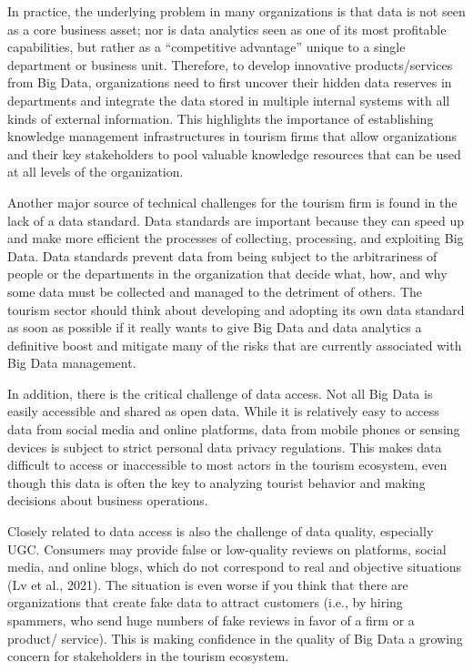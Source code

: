 \documentclass[
  letterpaper,
  DIV=11,
  numbers=noendperiod]{scrreprt}
\begin{document}
In practice, the underlying problem in many organizations is that data
is not seen as a core business asset; nor is data analytics seen as one
of its most profitable capabilities, but rather as a ``competitive
advantage'' unique to a single department or business unit. Therefore,
to develop innovative products/services from Big Data, organizations
need to first uncover their hidden data reserves in departments and
integrate the data stored in multiple internal systems with all kinds of
external information. This highlights the importance of establishing
knowledge management infrastructures in tourism firms that allow
organizations and their key stakeholders to pool valuable knowledge
resources that can be used at all levels of the organization.

Another major source of technical challenges for the tourism firm is
found in the lack of a data standard. Data standards are important
because they can speed up and make more efficient the processes of
collecting, processing, and exploiting Big Data. Data standards prevent
data from being subject to the arbitrariness of people or the
departments in the organization that decide what, how, and why some data
must be collected and managed to the detriment of others. The tourism
sector should think about developing and adopting its own data standard
as soon as possible if it really wants to give Big Data and data
analytics a definitive boost and mitigate many of the risks that are
currently associated with Big Data management.

In addition, there is the critical challenge of data access. Not all Big
Data is easily accessible and shared as open data. While it is
relatively easy to access data from social media and online platforms,
data from mobile phones or sensing devices is subject to strict personal
data privacy regulations. This makes data difficult to access or
inaccessible to most actors in the tourism ecosystem, even though this
data is often the key to analyzing tourist behavior and making decisions
about business operations.

Closely related to data access is also the challenge of data quality,
especially UGC. Consumers may provide false or low-quality reviews on
platforms, social media, and online blogs, which do not correspond to
real and objective situations (Lv et al., 2021). The situation is even
worse if you think that there are organizations that create fake data to
attract customers (i.e., by hiring spammers, who send huge numbers of
fake reviews in favor of a firm or a product/ service). This is making
confidence in the quality of Big Data a growing concern for stakeholders
in the tourism ecosystem.
\end{document}
